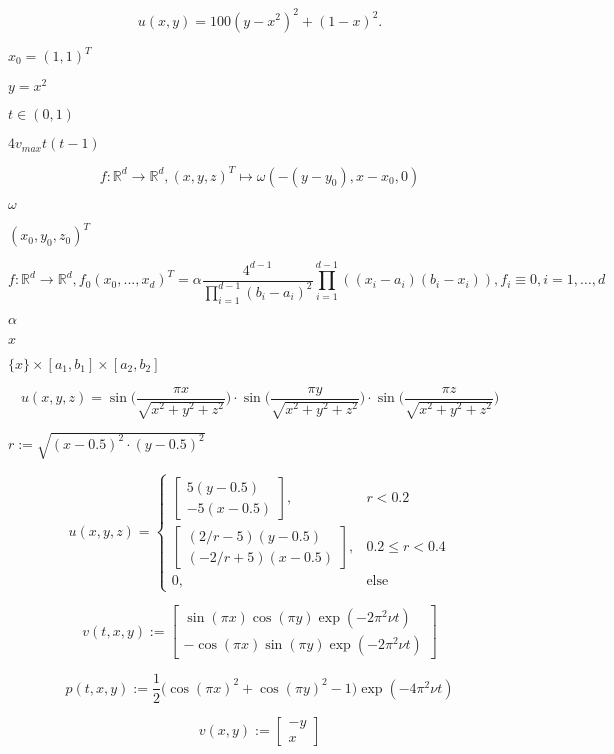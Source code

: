 \documentclass{article}
\begin{document}
\[
  u(x,y) = 100(y-x^2)^2 + (1-x)^2.
\]
\pagebreak

$ x_0 = (1, 1)^T$
\pagebreak

$ y = x^2 $
\pagebreak

$ t\in(0,1) $
\pagebreak

$4 v_{max} t (t-1)$
\pagebreak

\[
   f: \mathbb{R}^d \to \mathbb{R}^d, (x, y, z)^T \mapsto \omega (-(y - y_0), x - x_0, 0)
\]
\pagebreak

$ \omega $
\pagebreak

$ (x_0, y_0, z_0)^T $
\pagebreak

\[
   f: \mathbb{R}^d \to \mathbb{R}^d, f_0(x_0, ..., x_d)^T =
   \alpha \frac{4^{d-1}}{\prod_{i=1}^{d-1}(b_i - a_i)^2}\prod_{i=1}^{d-1}( (x_i - a_i)(b_i - x_i) ),
   f_i \equiv 0, i=1,\dots,d
\]
\pagebreak

$ \alpha $
\pagebreak

$ x $
\pagebreak

$ \{x\}\times [a_1, b_1] \times [a_2, b_2] $
\pagebreak

\[u(x,y,z) = \sin\bigg(\frac{\pi x}{\sqrt{x^2+y^2+z^2}}\bigg)\cdot
 \sin\bigg(\frac{\pi y}{\sqrt{x^2+y^2+z^2}}\bigg)\cdot
 \sin\bigg(\frac{\pi z}{\sqrt{x^2+y^2+z^2}}\bigg)\]
\pagebreak

$r := \sqrt{(x-0.5)^2 \cdot(y-0.5)^2}$
\pagebreak

\[u(x,y,z) = \begin{cases}\begin{bmatrix}5(y-0.5)\\ -5(x-0.5)\end{bmatrix},& r < 0.2\\
\begin{bmatrix}(2/r - 5)(y-0.5) \\ (-2/r + 5)(x-0.5)\end{bmatrix},& 0.2 \leq r < 0.4\\0, & \text{else}\end{cases}\]
\pagebreak

\[v(t,x,y) := \begin{bmatrix}\sin(\pi x)\cos(\pi y)\exp(-2\pi^2 \nu t)\\
-\cos(\pi x)\sin(\pi y)\exp(-2\pi^2 \nu t)\end{bmatrix}\]
\pagebreak

\[p(t,x,y) := \frac{1}{2}\Big(\cos(\pi x)^2 + \cos(\pi y)^2 -1\Big)\exp(-4\pi^2 \nu t)\]
\pagebreak

\[v(x,y) := \begin{bmatrix}-y\\x\end{bmatrix}\]
\pagebreak
\end{document}
